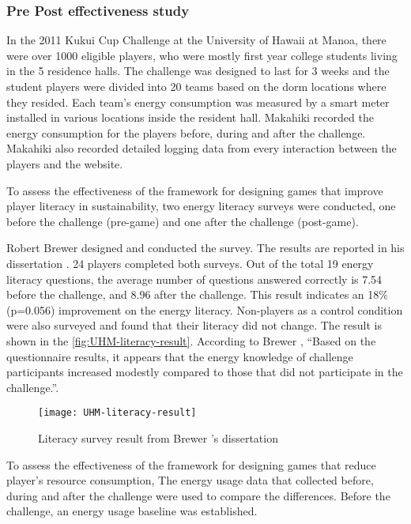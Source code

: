 \subsubsection{Pre Post effectiveness study}
\label{sec:player-pre-post-effectiveness-result}

In the 2011 Kukui Cup Challenge at the University of Hawaii at Manoa, there were over 1000 eligible players, who were mostly first
year college students living in the 5 residence halls. The challenge was designed to last for 3 weeks and the student players were divided into 20 teams based on the dorm locations where they resided. Each team's energy consumption was measured by a smart meter installed in various locations inside the resident hall. Makahiki recorded the energy consumption for the players before, during and after the challenge. Makahiki also recorded detailed logging data from every interaction between the players and the website. 

To assess the effectiveness of the framework for designing games that improve player literacy in sustainability, 
 two energy literacy surveys were conducted, one before the challenge (pre-game) and one after
the challenge (post-game). 

Robert Brewer designed and conducted the survey. The results are reported in his dissertation \cite{csdl2-10-08}. 24 players completed both surveys. Out of the total 19 energy literacy questions, the average number of questions answered correctly is 7.54 before the
challenge, and 8.96 after the challenge. This result indicates an 18\% (p=0.056) improvement on the
energy literacy.  Non-players as a control condition were also surveyed and found that their literacy did not change. The result is shown in the \autoref{fig:UHM-literacy-result}. According to Brewer \cite{csdl2-10-08}, ``Based on the questionnaire results, it appears that the energy knowledge of challenge participants increased modestly compared to those that did not participate in the challenge.''.
\begin{figure}[ht!]
  \center
  \texttt{[image: UHM-literacy-result]}
  \caption{Literacy survey result from Brewer 's dissertation \cite{csdl2-10-08}}
  \label{fig:UHM-literacy-result}
\end{figure}

To assess the effectiveness of the framework for designing games that reduce player's resource consumption, The energy usage data that collected before, during and after the
challenge were used to compare the differences.  Before the challenge, an energy usage baseline was established. 

